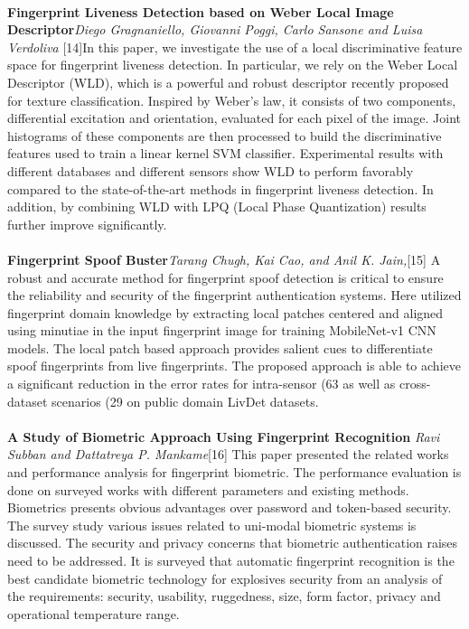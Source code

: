 \documentclass[a4paper,12pt,oneside]{article}
\begin{document}
\paragraph{}
\textbf{Fingerprint Liveness Detection
based on Weber Local Image Descriptor}\textit{Diego Gragnaniello, Giovanni Poggi, Carlo Sansone and Luisa Verdoliva} [14]In this paper, we investigate the use of a local discriminative feature space for fingerprint liveness detection. In particular, we rely on the Weber Local Descriptor (WLD),
which is a powerful and robust descriptor recently proposed for texture classification. Inspired by Weber’s law, it consists of two components, differential excitation and orientation, evaluated for each pixel of the image. Joint histograms of these components are then processed to build the discriminative features used to train a linear kernel SVM classifier. Experimental results with different databases and different sensors show WLD to perform favorably compared to the state-of-the-art methods in fingerprint liveness detection. In addition, by combining WLD with LPQ (Local Phase
Quantization) results further improve significantly.

\paragraph{}
\textbf{Fingerprint Spoof Buster}\textit{Tarang Chugh, Kai Cao, and Anil K. Jain,}[15] A robust and accurate method for fingerprint spoof detection
is critical to ensure the reliability and security of the fingerprint
authentication systems. Here utilized
fingerprint domain knowledge by extracting local patches
centered and aligned using minutiae in the input fingerprint
image for training MobileNet-v1 CNN models. The local patch
based approach provides salient cues to differentiate spoof
fingerprints from live fingerprints. The proposed approach is
able to achieve a significant reduction in the error rates for
intra-sensor (63%
as well as cross-dataset scenarios (29%
on public domain LivDet datasets.




\paragraph{}
\textbf{A Study of Biometric Approach Using Fingerprint
Recognition} \textit{ Ravi Subban and Dattatreya P. Mankame}[16] This paper presented the related works and performance
analysis for fingerprint biometric. The performance
evaluation is done on surveyed works with different
parameters and existing methods. Biometrics presents
obvious advantages over password and token-based security.
The survey study various issues related to uni-modal
biometric systems is discussed. The security and privacy
concerns that biometric authentication raises need to be
addressed. It is surveyed that automatic fingerprint
recognition is the best candidate biometric technology for
explosives security from an analysis of the requirements:
security, usability, ruggedness, size, form factor, privacy and
operational temperature range. 
\end{document}
